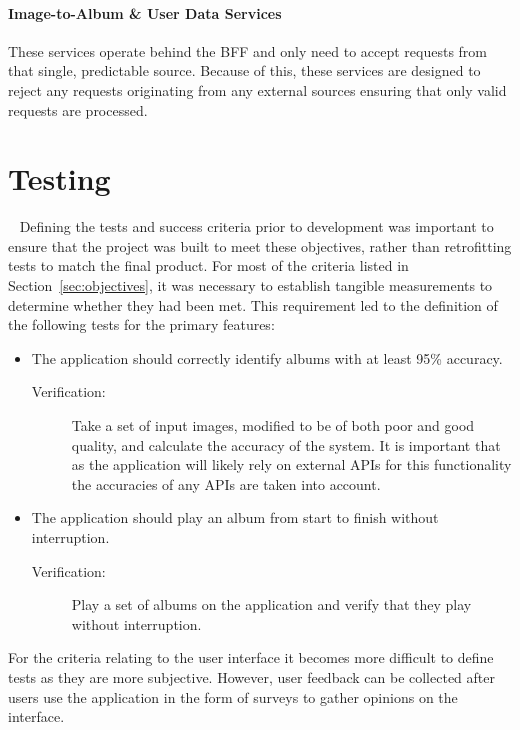\paragraph{Image-to-Album \& User Data Services} These services operate behind the BFF and only need to accept requests from that single, predictable source. Because of this, these services are designed to reject any requests originating from any external sources ensuring that only valid requests are processed.

\section{Testing}~\label{sec:test-design}
Defining the tests and success criteria prior to development was important to ensure that the project was built to meet these objectives, rather than retrofitting tests to match the final product. For most of the criteria listed in Section~\ref{sec:objectives}, it was necessary to establish tangible measurements to determine whether they had been met. This requirement led to the definition of the following tests for the primary features:
\begin{itemize}
    \item The application should correctly identify albums with at least 95\% accuracy.
    \begin{description}
        \item[Verification:] Take a set of input images, modified to be of both poor and good quality, and calculate the accuracy of the system. It is important that as the application will likely rely on external APIs for this functionality the accuracies of any APIs are taken into account.
    \end{description}
    \item The application should play an album from start to finish without interruption.
    \begin{description}
        \item[Verification:] Play a set of albums on the application and verify that they play without interruption.
    \end{description}
\end{itemize}

For the criteria relating to the user interface it becomes more difficult to define tests as they are more subjective. However, user feedback can be collected after users use the application in the form of surveys to gather opinions on the interface.

